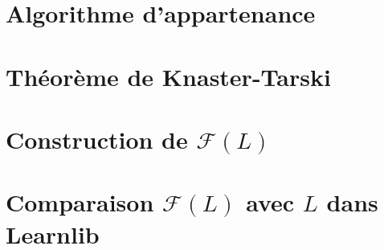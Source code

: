 	\newpage
	
	

	\appendix
	\chapter{Algorithme d'appartenance}\label{app:membership}
	\chapter{Théorème de Knaster-Tarski}\label{app:tarski}
	\chapter{Construction de $\mathcal{F}(L)$}\label{app:exemple}
	\chapter{Comparaison $\mathcal{F}(L)$ avec $L$ dans Learnlib}


